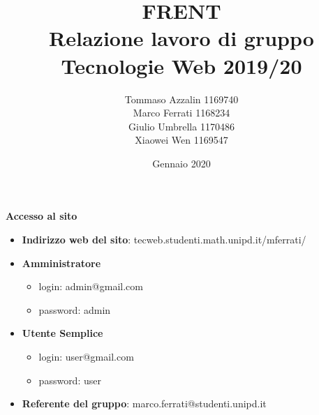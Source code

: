 \documentclass[11pt]{article}
\title{ FRENT \\ Relazione lavoro di gruppo Tecnologie Web 2019/20}
\author{Tommaso Azzalin 1169740  \\ Marco Ferrati 1168234 \\  Giulio Umbrella  1170486 \\  Xiaowei Wen 1169547}
\date{Gennaio 2020}
\begin{document}
\maketitle
\textbf{Accesso al sito}
\begin{itemize}
\item \textbf{Indirizzo web del sito}: tecweb.studenti.math.unipd.it/mferrati/
\item \textbf{Amministratore}
	\begin{itemize}
	\item login: admin@gmail.com
	\item password: admin
	\end{itemize}
\item \textbf{Utente Semplice}
	\begin{itemize}
	\item login: user@gmail.com
	\item password: user
	\end{itemize}
\item \textbf{Referente del gruppo}: marco.ferrati@studenti.unipd.it
\end{itemize}
\newpage
\tableofcontents
\newpage

\end{document}
